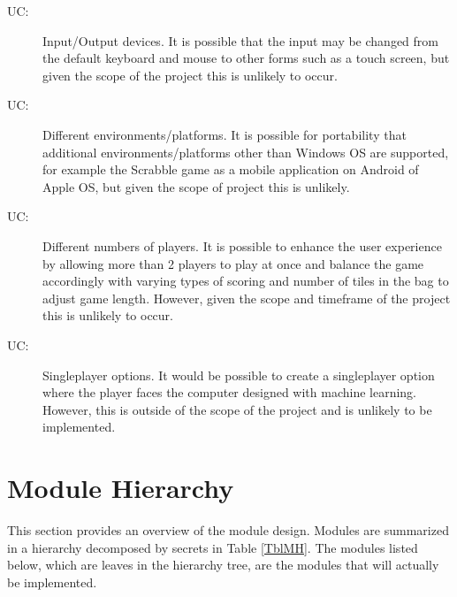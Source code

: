\documentclass[12pt, titlepage]{article}
\newcounter{ucnum}
\newcommand{\uctheucnum}{UC\theucnum}
\begin{document}

\begin{description}
\item [ \uctheucnum \label{ucIO}:] Input/Output devices. It is possible that the input may be changed from the default keyboard and mouse to other forms such as a touch screen, but given the scope of the project this is unlikely to occur.
\item [ \uctheucnum \label{ucEnviro}:] Different environments/platforms. It is possible for portability that additional environments/platforms other than Windows OS are supported, for example the Scrabble game as a mobile application on Android of Apple OS, but given the scope of project this is unlikely.
\item [ \uctheucnum \label{ucNumPlay}:] Different numbers of players. It is possible to enhance the user experience by allowing more than 2 players to play at once and balance the game accordingly with varying types of scoring and number of tiles in the bag to adjust game length. However, given the scope and timeframe of the project this is unlikely to occur.
\item [ \uctheucnum \label{ucSP}:] Singleplayer options. It would be possible to create a singleplayer option where the player faces the computer designed with machine learning. However, this is outside of the scope of the project and is unlikely to be implemented.
\end{description}

\section{Module Hierarchy} \label{SecMH} %

This section provides an overview of the module design. Modules are summarized
in a hierarchy decomposed by secrets in Table \ref{TblMH}. The modules listed
below, which are leaves in the hierarchy tree, are the modules that will
actually be implemented.
\end{document}
